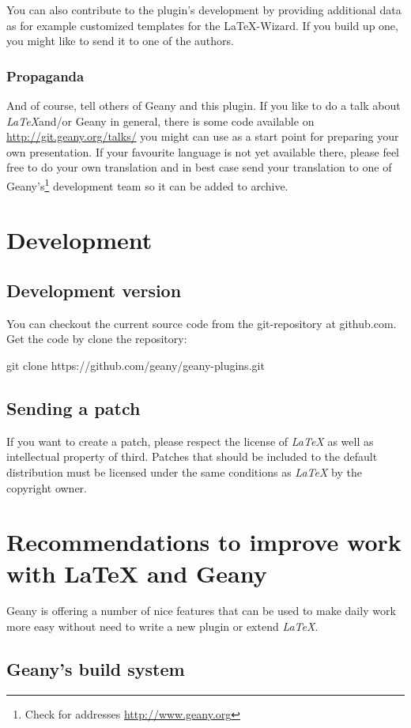 \documentclass[%
paper=a4,%
fontsize=11pt,%
twoside=false,%
DIV18,%
headsepline,%
plainheadsepline,%
footsepline,%
plainfootsepline,%
bibliography=totoc,%
listof=totoc,%
BCOR10mm,%
parskip=half,%
openany,%
]{scrreprt}
\begin{document}
You can also contribute to the plugin's development by providing
additional data as for example customized templates for the
\LaTeX-Wizard. If you build up one, you might like to send it to
one of the authors.

\subsection{Propaganda}
And of course, tell others of Geany and this plugin. If you like to do
a talk about \textit{LaTeX}and/or Geany in general, there is some code
available on \url{http://git.geany.org/talks/} you might can use as a
start point for preparing your own presentation. If your favourite
language is not yet available there, please feel free to do your own
translation and in best case send your translation to one of
Geany's\footnote{Check for addresses \url{http://www.geany.org}}
development team so it can be added to archive.


\chapter{Development}
\section{Development version}
You can checkout the current source code from the git-repository
at github.com. Get the code by clone the repository:

git clone https://github.com/geany/geany-plugins.git

\section{Sending a patch}
\label{sec:sending_a_patch}
If you want to create a patch, please respect the license of
\textit{LaTeX} as well as intellectual property of third. Patches that
should be included to the default distribution must be licensed under
the same conditions as \textit{LaTeX} by the copyright owner.

\chapter{Recommendations to improve work with \LaTeX{} and Geany}
Geany is offering a number of nice features that can be used to make
daily work more easy without need to write a new plugin or extend
\textit{LaTeX}.

\section{Geany's build system}
\end{document}

